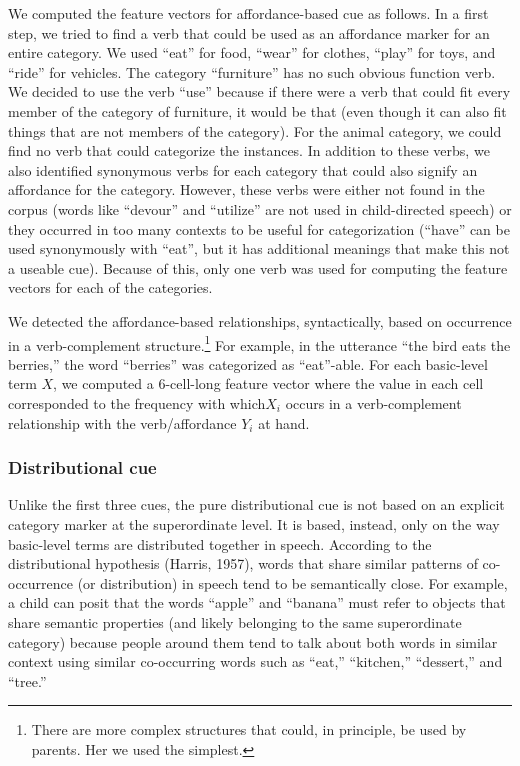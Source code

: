 \documentclass[english,,man]{apa6}
\let\rmarkdownfootnote\footnote%
\def\footnote{\protect\rmarkdownfootnote}
\begin{document}
We computed the feature vectors for affordance-based cue as follows. In a first step, we tried to find a verb that could be used as an affordance marker for an entire category. We used \enquote{eat} for food, \enquote{wear} for clothes, \enquote{play} for toys, and \enquote{ride} for vehicles. The category \enquote{furniture} has no such obvious function verb. We decided to use the verb \enquote{use} because if there were a verb that could fit every member of the category of furniture, it would be that (even though it can also fit things that are not members of the category). For the animal category, we could find no verb that could categorize the instances. In addition to these verbs, we also identified synonymous verbs for each category that could also signify an affordance for the category. However, these verbs were either not found in the corpus (words like \enquote{devour} and \enquote{utilize} are not used in child-directed speech) or they occurred in too many contexts to be useful for categorization (\enquote{have} can be used synonymously with \enquote{eat}, but it has additional meanings that make this not a useable cue). Because of this, only one verb was used for computing the feature vectors for each of the categories.

We detected the affordance-based relationships, syntactically, based on occurrence in a verb-complement structure.\footnote{There are more complex structures that could, in principle, be used by parents. Her we used the simplest.} For example, in the utterance \enquote{the bird eats the berries,} the word \enquote{berries} was categorized as \enquote{eat}-able. For each basic-level term \(X\), we computed a 6-cell-long feature vector where the value in each cell corresponded to the frequency with which\(X_i\) occurs in a verb-complement relationship with the verb/affordance \(Y_i\) at hand.

\hypertarget{distributional-cue}{%
\subsubsection{Distributional cue}\label{distributional-cue}}

Unlike the first three cues, the pure distributional cue is not based on an explicit category marker at the superordinate level. It is based, instead, only on the way basic-level terms are distributed together in speech. According to the distributional hypothesis (Harris, 1957), words that share similar patterns of co-occurrence (or distribution) in speech tend to be semantically close. For example, a child can posit that the words \enquote{apple} and \enquote{banana} must refer to objects that share semantic properties (and likely belonging to the same superordinate category) because people around them tend to talk about both words in similar context using similar co-occurring words such as \enquote{eat,} \enquote{kitchen,} \enquote{dessert,} and \enquote{tree.}
\end{document}
